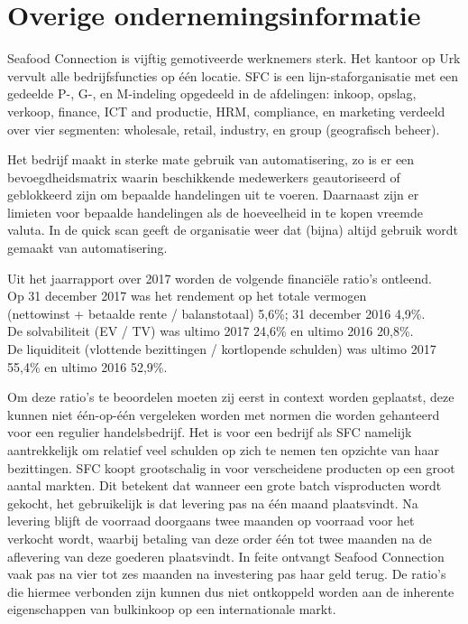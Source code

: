 \documentclass[10pt,a4paper,twoside]{report}
\begin{document}
\section{Overige ondernemingsinformatie}
Seafood Connection is vijftig gemotiveerde werknemers sterk. Het kantoor op Urk vervult alle bedrijfsfuncties op één locatie. SFC is een lijn-staforganisatie met een gedeelde P-, G-, en M-indeling opgedeeld in de afdelingen: inkoop, opslag, verkoop, finance, ICT and productie, HRM, compliance, en marketing verdeeld over vier segmenten: wholesale, retail, industry, en group (geografisch beheer). \citep{quickscan}

Het bedrijf maakt in sterke mate gebruik van automatisering, zo is er een bevoegdheidsmatrix waarin beschikkende medewerkers geautoriseerd of geblokkeerd zijn om bepaalde handelingen uit te voeren. Daarnaast zijn er limieten voor bepaalde handelingen als de hoeveelheid in te kopen vreemde valuta. In de quick scan geeft de organisatie weer dat (bijna) altijd gebruik wordt gemaakt van automatisering. \citep{quickscan}

Uit het jaarrapport over 2017 worden de volgende financiële ratio’s ontleend. \\
Op 31 december 2017 was het rendement op het totale vermogen \\
(nettowinst + betaalde rente / balanstotaal) 5,6\%; 31 december 2016 4,9\%. \\
De solvabiliteit (EV / TV) was ultimo 2017 24,6\% en ultimo 2016 20,8\%. \\
De liquiditeit (vlottende bezittingen / kortlopende schulden) was ultimo 2017 55,4\% en ultimo 2016 52,9\%. \citep{jaarrapport2017}

Om deze ratio’s te beoordelen moeten zij eerst in context worden geplaatst, deze kunnen niet één-op-één vergeleken worden met normen die worden gehanteerd voor een regulier handelsbedrijf. Het is voor een bedrijf als SFC namelijk aantrekkelijk om relatief veel schulden op zich te nemen ten opzichte van haar bezittingen. SFC koopt grootschalig in voor verscheidene producten op een groot aantal markten. Dit betekent dat wanneer een grote batch visproducten wordt gekocht, het gebruikelijk is dat levering pas na één maand plaatsvindt. Na levering blijft de voorraad doorgaans twee maanden op voorraad voor het verkocht wordt, waarbij betaling van deze order één tot twee maanden na de aflevering van deze goederen plaatsvindt. In feite ontvangt Seafood Connection vaak pas na vier tot zes maanden na investering pas haar geld terug. De ratio’s die hiermee verbonden zijn kunnen dus niet ontkoppeld worden aan de inherente eigenschappen van bulkinkoop op een internationale markt. \citep{jaarrapport2017}
\end{document}
